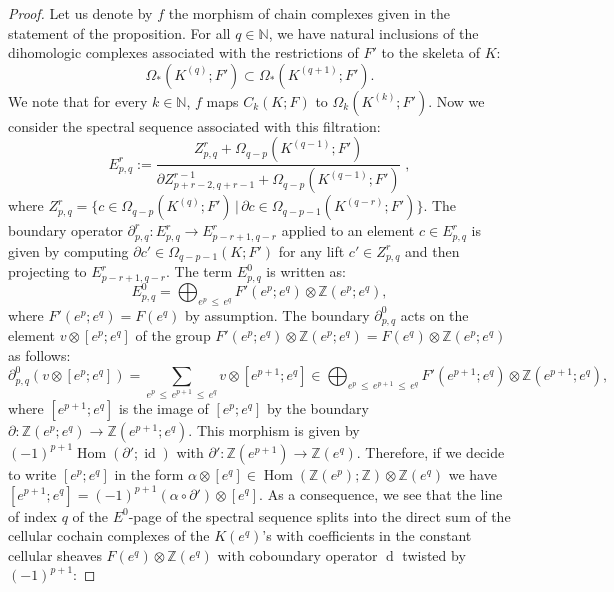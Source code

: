 \documentclass[10pt]{amsart}
\theoremstyle{definition}
\numberwithin{equation}{section}
\numberwithin{figure}{section}
\newcommand{\Z}{\mathbb{Z}}
\newcommand{\N}{\mathbb{N}}
\DeclareMathOperator{\Hom}{Hom}
\DeclareMathOperator{\id}{id}
\DeclareMathOperator{\df}{d}
\begin{document}
\begin{proof}
Let us denote by $f$ the morphism of chain complexes given in the statement of the proposition. For all $q\in\N$, we have natural inclusions of the dihomologic complexes associated with the restrictions of $F'$ to the skeleta of $K$:
\begin{equation*}
\Omega_*\left(K^{(q)};F'\right)\subset \Omega_*\left(K^{(q+1)};F'\right).
\end{equation*}
We note that for every $k\in\N$, $f$ maps $C_k(K;F)$ to $\Omega_k(K^{(k)};F')$. Now we consider the spectral sequence associated with this filtration:
\begin{equation*}
E^r_{p,q}:=\frac{Z^r_{p,q} + \Omega_{q-p}\left(K^{(q-1)};F'\right)}{\partial Z^{r-1}_{p+r-2,q+r-1}+\Omega_{q-p}\left(K^{(q-1)};F'\right)}\;,
\end{equation*}
where $Z^r_{p,q}=\{c\in \Omega_{q-p}(K^{(q)};F') \,|\, \partial c \in \Omega_{q-p-1}(K^{(q-r)};F') \}$. The boundary operator $\partial^r_{p,q}:E^r_{p,q}\rightarrow E^r_{p-r+1,q-r}$ applied to an element $c\in E^r_{p,q}$ is given by computing $\partial c'\in \Omega_{q-p-1}(K;F')$ for any lift $c'\in Z^r_{p,q}$ and then projecting to $E^r_{p-r+1,q-r}$. The term $E^0_{p,q}$ is written as:
\begin{equation*}
E^0_{p,q}=\bigoplus_{e^p\,\leq\,e^q} F'(e^p;e^q)\otimes\Z(e^p;e^q),
\end{equation*}
where $F'(e^p;e^q)=F(e^q)$ by assumption. The boundary $\partial^0_{p,q}$ acts on the element $v\otimes[e^p;e^q]$ of the group $F'(e^p;e^q)\otimes\Z(e^p;e^q)=F(e^q)\otimes\Z(e^p;e^q)$ as follows:
\begin{equation*}
\partial^0_{p,q} \left(v\otimes[e^p;e^q]\right) =\sum_{e^p\,\leq\,e^{p+1}\,\leq \,e^q}v\otimes \left[e^{p+1};e^q\right] \in \bigoplus_{e^p\,\leq\,e^{p+1}\,\leq \,e^q}F'\left(e^{p+1};e^q\right)\otimes\Z\left(e^{p+1};e^q\right),
\end{equation*}
where $[e^{p+1};e^q]$ is the image of $[e^p;e^q]$ by the boundary $\partial:\Z(e^{p};e^q)\rightarrow \Z(e^{p+1};e^q)$. This morphism is given by $(-1)^{p+1}\Hom(\partial';\id)$ with $\partial':\Z(e^{p+1})\rightarrow\Z(e^q)$. Therefore, if we decide to write $[e^p;e^q]$ in the form $\alpha\otimes[e^q]\in \Hom(\Z(e^p);\Z)\otimes \Z(e^q)$ we have $[e^{p+1};e^q]=(-1)^{p+1}(\alpha\circ\partial')\otimes[e^q]$. As a consequence, we see that the line of index $q$ of the $E^0$-page of the spectral sequence splits into the direct sum of the cellular cochain complexes of the $K(e^q)$'s with coefficients in the constant cellular sheaves $F(e^q)\otimes\Z(e^q)$ with coboundary operator $\df$ twisted by $(-1)^{p+1}$:

\end{proof}
\end{document}
